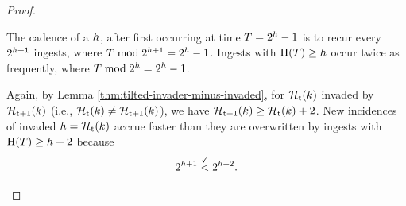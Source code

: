 \begin{proof}
\begin{proofpart}
The cadence of a \hv{} $\colorh$, after first occurring at time $\colorT=2^{\colorh} - 1$ is to recur every $2^{\colorh + 1}$ ingests, where $\colorT \bmod 2^{\colorh + 1} = 2^{\colorh} - 1$.
Ingests with \hv{} $\colorH(\colorT) \geq \colorh$ occur twice as frequently, where $\colorT \bmod 2^{\colorh} = 2^{\colorh} - 1$.

Again, by Lemma \ref{thm:tilted-invader-minus-invaded}, for \hv{} $\colorHcal_{\colort}(\colork)$ invaded by \hv{} $\colorHcal_{\colort + 1}(\colork)$ (i.e., $\colorHcal_{\colort}(\colork) \neq \colorHcal_{\colort + 1}(\colork)$), we have $\colorHcal_{\colort + 1}(\colork) \geq \colorHcal_{\colort}(\colork) + 2$.
New incidences of invaded \hv{} $\colorh = \colorHcal_{\colort}(\colork)$ accrue faster than they are overwritten by ingests with $\colorH(\colorT) \geq \colorh + 2$ because
\begin{align*}
2^{\colorh + 1} \stackrel{\checkmark}{<} 2^{\colorh + 2}.
\end{align*}
\end{proofpart}

\end{proof}
